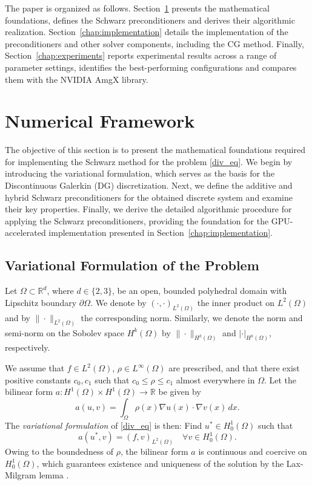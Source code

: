 \documentclass[11pt]{article}
\theoremstyle{definition}
\theoremstyle{theorem}
\begin{document}
The paper is organized as follows. Section~\ref{chap:theory} presents
the mathematical foundations, defines the Schwarz preconditioners
and derives their algorithmic realization. Section~\ref{chap:implementation}
details the implementation of the preconditioners and other solver components,
including the CG method. Finally, Section~\ref{chap:experiments} reports
experimental results across a range of parameter settings, identifies
the best-performing configurations and compares them with the
NVIDIA AmgX library.

\section{Numerical Framework}
\label{chap:theory}

The objective of this section is to present the mathematical foundations required for
implementing the Schwarz method for the problem \eqref{div_eq}. We begin by introducing the
variational formulation, which serves as the basis for the
Discontinuous Galerkin (DG) discretization. Next, we define the additive and hybrid
Schwarz preconditioners for the obtained discrete system and examine their key properties.
Finally, we derive the detailed algorithmic procedure
for applying the Schwarz preconditioners, providing the foundation for the
GPU\nobreakdash-accelerated implementation presented in Section~\ref{chap:implementation}.

\subsection{Variational Formulation of the Problem}
\label{sec:variational-formulation}

Let $\Omega \subset \mathbb{R}^d$, where $d\in \{2, 3\}$, be an open, bounded
polyhedral domain with Lipschitz boundary $\partial \Omega$. We denote by
$(\cdot, \cdot)_{L^2(\Omega)}$ the inner product on $L^2(\Omega)$ and by
$\| \cdot \|_{L^2(\Omega)}$ the corresponding norm.
Similarly, we denote the norm and semi-norm on the Sobolev space $H^k(\Omega)$
by $\|\cdot\|_{H^k(\Omega)}$ and $|\cdot|_{H^k(\Omega)}$, respectively.

We assume that
${f\in L^2(\Omega)}$, ${\rho\in L^\infty(\Omega)}$ are prescribed, and that there
exist positive constants $c_0, c_1$ such that $c_0 \leq \rho \leq c_1$ almost everywhere
in $\Omega$. Let the bilinear form
${a: H^1(\Omega)\times H^1(\Omega) \to \mathbb{R}}$ be given by
\[
  a(u, v) = \int_\Omega \rho(x) \nabla u(x) \cdot \nabla v(x)\, dx.
\]
The \emph{variational formulation} of \eqref{div_eq} is then:
Find $u^* \in H_0^1(\Omega)$ such that
\begin{equation}
  a(u^*, v) = (f, v)_{L^2(\Omega)} \quad \forall v \in H_0^1(\Omega).\label{var-cont-formulation}
\end{equation}
Owing to the boundedness of $\rho$, the bilinear form $a$ is continuous and coercive
on $H_0^1(\Omega)$, which guarantees existence and uniqueness of the solution
by the Lax-Milgram lemma \cite{Brenner}.
\end{document}

